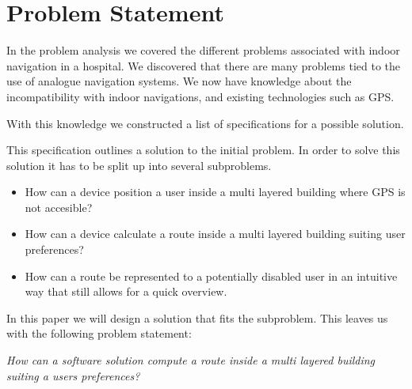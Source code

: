 \chapter{Problem Statement}




In the problem analysis we covered the different problems associated with indoor navigation in a hospital.
We discovered that there are many problems tied to the use of analogue navigation systems. We now have knowledge about the incompatibility with indoor navigations, and existing technologies such as GPS.



With this knowledge we constructed a list of specifications for a possible solution.




This specification outlines a solution to the initial problem. In order to solve this solution it has to be split up into several subproblems.

\begin{itemize}
	\item How can a device position a user inside a multi layered building where GPS is not accesible?
	\item How can a device calculate a route inside a multi layered building suiting user preferences?
	\item How can a route be represented to a potentially disabled user in an intuitive way that still allows for a quick overview.
\end{itemize}

In this paper we will design a solution that fits the  subproblem. This leaves us with the following problem statement:

\begin{displayquote}
    \textit{How can a software solution compute a route inside a multi layered building suiting a users preferences?}\label{sub:problem_statement}
\end{displayquote}

